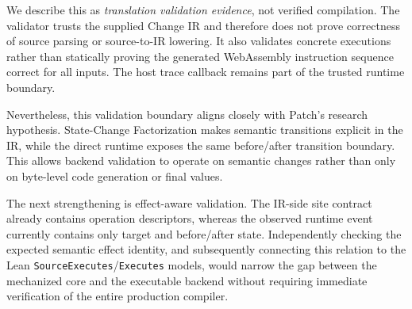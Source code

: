 We describe this as \emph{translation validation evidence}, not verified compilation. The validator trusts the supplied Change IR and therefore does not prove correctness of source parsing or source-to-IR lowering. It also validates concrete executions rather than statically proving the generated WebAssembly instruction sequence correct for all inputs. The host trace callback remains part of the trusted runtime boundary.

Nevertheless, this validation boundary aligns closely with Patch's research hypothesis. State-Change Factorization makes semantic transitions explicit in the IR, while the direct runtime exposes the same before/after transition boundary. This allows backend validation to operate on semantic changes rather than only on byte-level code generation or final values.

The next strengthening is effect-aware validation. The IR-side site contract already contains operation descriptors, whereas the observed runtime event currently contains only target and before/after state. Independently checking the expected semantic effect identity, and subsequently connecting this relation to the Lean \texttt{SourceExecutes}/\texttt{Executes} models, would narrow the gap between the mechanized core and the executable backend without requiring immediate verification of the entire production compiler.
